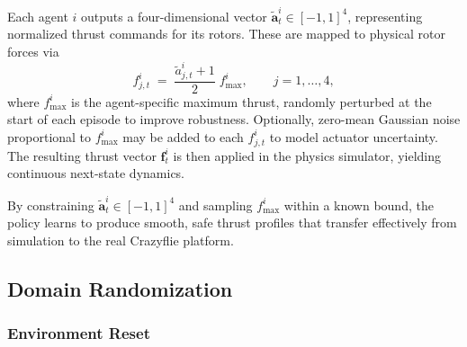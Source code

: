 Each agent \(i\) outputs a four-dimensional vector \(\tilde{\mathbf{a}}^i_t\in[-1,1]^4\), representing normalized thrust commands for its rotors.  These are mapped to physical rotor forces via
\begin{equation}
f^i_{j,t}
\;=\;
\frac{\tilde{a}^i_{j,t} + 1}{2}\;f_{\max}^i,
\qquad
j=1,\dots,4,
\end{equation}
where \(f_{\max}^i\) is the agent-specific maximum thrust, randomly perturbed at the start of each episode to improve robustness.  Optionally, zero-mean Gaussian noise proportional to \(f_{\max}^i\) may be added to each \(f^i_{j,t}\) to model actuator uncertainty.  The resulting thrust vector \(\mathbf{f}^i_t\) is then applied in the physics simulator, yielding continuous next-state dynamics.  

By constraining \(\tilde{\mathbf{a}}^i_t\in[-1,1]^4\) and sampling \(f_{\max}^i\) within a known bound, the policy learns to produce smooth, safe thrust profiles that transfer effectively from simulation to the real Crazyflie platform.  
\subsection{Domain Randomization}
\subsubsection{Environment Reset}
\label{sec:reset}

